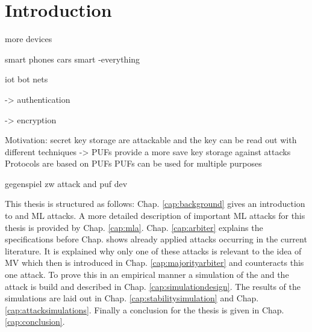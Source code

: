 \chapter{Introduction}


more devices

smart phones
cars
smart -everything

iot
bot nets

-> authentication

-> encryption


Motivation: secret key storage are attackable and the key can be read out with different techniques
-> PUFs provide a more save key storage against attacks
Protocols are based on PUFs
PUFs can be used for multiple purposes

gegenspiel zw attack and puf dev

This thesis is structured as follows: 
Chap. \ref{cap:background} gives an introduction to \pufs and \ac{ML} attacks.
A more detailed description of important \ac{ML} attacks for this thesis is provided by Chap. \ref{cap:mla}.
Chap. \ref{cap:arbiter} explains the \apuf specifications before Chap. shows already applied attacks occurring in the current literature.
It is explained why only one of these attacks is relevant to the idea of \ac{MV} which then is introduced in Chap. \ref{cap:majorityarbiter} and counteracts this one attack.
To prove this in an empirical manner a simulation of the \apuf and the attack is build and described in Chap. \ref{cap:simulationdesign}.
The results of the simulations are laid out in Chap. \ref{cap:stabilitysimulation} and Chap. \ref{cap:attacksimulations}.
Finally a conclusion for the thesis is given in Chap. \ref{cap:conclusion}.

